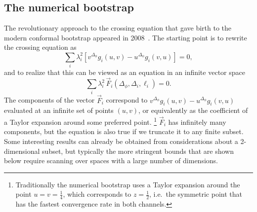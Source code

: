 \documentclass[a4paper,12pt]{article}
\numberwithin{equation}{section}
\begin{document}
\subsection{The numerical bootstrap}

The revolutionary approach to the crossing equation that gave birth to the modern conformal bootstrap appeared in 2008~\cite{Rattazzi:2008pe}.
The starting point is to rewrite the crossing equation as
\begin{equation}
	\sum_i \lambda_i^2 \left[ v^{\Delta_\phi} g_i(u,v)
	- u^{\Delta_\phi} g_i(v,u) \right] = 0,
\end{equation}
and to realize that this can be viewed as an equation in an infinite vector space
\begin{equation}
	\sum_i \lambda_i^2 \, \vec{F}_i(\Delta_\phi, \Delta_i, \ell_i) = 0.
	\label{eq:crossingequation:vector}
\end{equation}
The components of the vector $\vec{F}_i$ correspond to $v^{\Delta_\phi} g_i(u,v) - u^{\Delta_\phi} g_i(v,u)$ evaluated at an infinite set of points $(u,v)$, or equivalently as the coefficient of a Taylor expansion around some preferred point.%
%
\footnote{Traditionally the numerical bootstrap uses a Taylor expansion around the point $u = v = \frac{1}{4}$, which corresponds to $z = \frac{1}{2}$, i.e.~the symmetric point that has the fastest convergence rate in both channels.}
%
$\vec{F}_i$ has infinitely many components, but the equation is also true if we truncate it to any finite subset. Some interesting results can already be obtained from considerations about a 2-dimensional subset, but typically the more stringent bounds that are shown below require scanning over spaces with a large number of dimensions.
\end{document}
